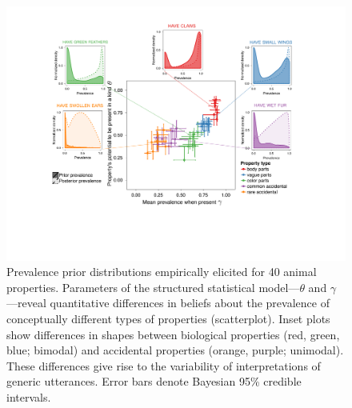 \documentclass{pnastwo}
\begin{document}
\begin{figure}
\centering
    \includegraphics[width=\columnwidth]{prevalence-asymmetry-scatterwDists-byItem.pdf}
    \caption{Prevalence prior distributions empirically elicited for 40 animal properties.
    Parameters of the structured statistical model---$\theta$ and $\gamma$---reveal quantitative differences in beliefs about the prevalence of conceptually different types of properties (scatterplot). 
    Inset plots show differences in shapes between biological properties (red, green, blue; bimodal) and accidental properties (orange, purple; unimodal).   
  These differences give rise to the variability of interpretations of generic utterances. 
      Error bars denote Bayesian 95\% credible intervals.
  }
  \label{fig:prior2}
\end{figure}
\end{document}
